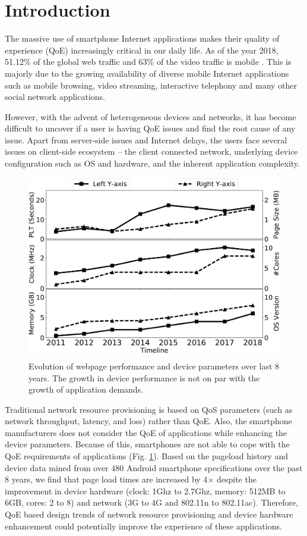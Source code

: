 \section{Introduction}
The massive use of smartphone Internet applications makes their quality of experience (QoE) increasingly critical in our daily life. 
As of the year 2018, 51.12\% of the global web traffic and 63\% of the video traffic is mobile \cite{statista2}. 
This is majorly due to the growing availability of diverse mobile Internet applications such as mobile browsing, video streaming, interactive telephony and many other social network applications.

However, with the advent of heterogeneous devices and networks, it has become difficult to uncover if a user is having QoE issues and find the root cause of any issue. 
Apart from server-side issues and Internet delays, the users face several issues on client-side ecosystem -- the client connected network, underlying device configuration such as OS and hardware, and the inherent application complexity.

\begin{figure}[t]
\centering
\includegraphics[width=0.85\linewidth]{sections/evolv}
\vspace{-0.3cm}
\caption{Evolution of webpage performance and device parameters over last 8 years. The growth in device performance is not on par with the growth of application demands.}
\label{fig:evolv}
\vspace{-0.6cm}
\end{figure}

Traditional network resource provisioning is based on QoS parameters (such as network throughput, latency, and loss) rather than QoE. 
Also, the smartphone manufacturers does not consider the QoE of applications while enhancing the device parameters.
Because of this, smartphones are not able to cope with the QoE requirements of applications (Fig. \ref{fig:evolv}).
Based on the pageload history \cite{htarch} and device data mined from over 480 Android smartphone specifications over the past 8 years, we find that page load times are increased by 4$\times$ despite the improvement in device hardware (clock: 1Ghz to 2.7Ghz, memory: 512MB to 6GB, cores: 2 to 8) and network (3G to 4G and 802.11n to 802.11ac).
Therefore, QoE based design trends of network resource provisioning and device hardware enhancement could potentially improve the experience of these applications.

